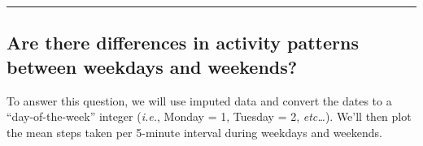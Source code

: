 \documentclass[
  paper=a4,
  ,captions=tableheading
]{scrartcl}
\begin{document}
\begin{center}\rule{0.5\linewidth}{0.5pt}\end{center}

\hypertarget{are-there-differences-in-activity-patterns-between-weekdays-and-weekends}{%
\subsection{Are there differences in activity patterns between weekdays
and
weekends?}\label{are-there-differences-in-activity-patterns-between-weekdays-and-weekends}}

To answer this question, we will use imputed data and convert the dates
to a ``day-of-the-week'' integer (\emph{i.e.}, Monday = 1, Tuesday = 2,
\emph{etc\ldots{}}). We'll then plot the mean steps taken per 5-minute
interval during weekdays and weekends.
\end{document}
